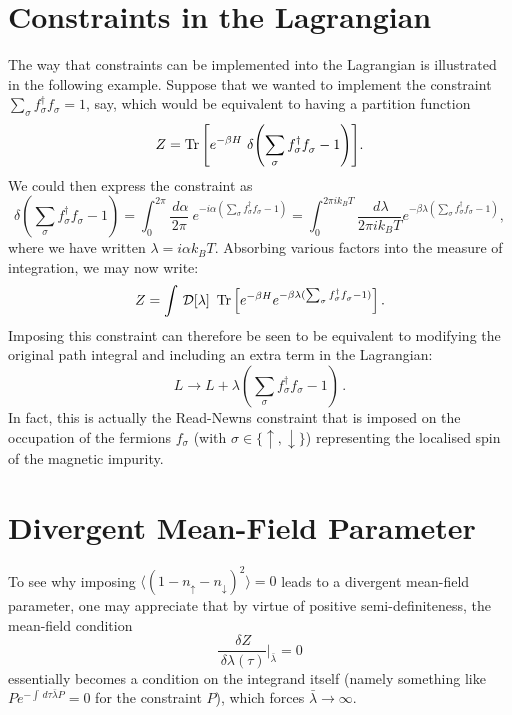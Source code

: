 
\appendix



\section{Constraints in the Lagrangian}
\label{sec:Constraints}

The way that constraints can be implemented into the Lagrangian is illustrated in the following example. Suppose that we wanted to implement the constraint $ \sum_{\sigma} f^{\dagger}_{\sigma} f^{}_{\sigma} = 1 $, say, which would be equivalent to having a partition function $$ Z = \operatorname{Tr}{\left[ e^{- \beta H}~\delta{\left( \sum_{\sigma} f^{\dagger}_{\sigma} f^{}_{\sigma} - 1 \right)} \right]} . $$ We could then express the constraint as $$ \delta{\left( \sum_{\sigma} f^{\dagger}_{\sigma} f^{}_{\sigma} - 1 \right)} = \int_{0}^{2 \pi} \frac{\,d\alpha}{2 \pi}~e^{- i \alpha (\sum_{\sigma} f^{\dagger}_{\sigma} f^{}_{\sigma} - 1)} = \int_{0}^{2 \pi i k_B T} \frac{\,d \lambda}{2 \pi i k_B T} e^{- \beta \lambda (\sum_{\sigma} f^{\dagger}_{\sigma} f^{}_{\sigma} - 1)}, $$ where we have written $ \lambda = i \alpha k_B T $. Absorbing various factors into the measure of integration, we may now write: $$ Z = \int \, \mathcal{D} [\lambda]~\operatorname{Tr}{\left[ e^{- \beta H} e^{- \beta \lambda (\sum_{\sigma} f^{\dagger}_{\sigma} f^{}_{\sigma} - 1)} \right]} \,. $$ Imposing this constraint can therefore be seen to be equivalent to modifying the original path integral and including an extra term in the Lagrangian: $$ L \rightarrow L + \lambda \left( \sum_{\sigma} f^{\dagger}_{\sigma} f^{}_{\sigma} - 1 \right) \,. $$ In fact, this is actually the Read-Newns constraint that is imposed on the occupation of the fermions $ f^{}_{\sigma} $ (with $ \sigma \in \{ \uparrow , \downarrow \}$) representing the localised spin of the magnetic impurity.

\section{Divergent Mean-Field Parameter}
\label{sec:Divergence}

To see why imposing $ \langle (1 - n_{\uparrow} - n_{\downarrow})^2 \rangle = 0 $ leads to a divergent mean-field parameter, one may appreciate that by virtue of positive semi-definiteness, the mean-field condition \[ \frac{\, \delta Z}{\, \delta \lambda(\tau)} \Bigr|_{\bar{\lambda}} = 0 \] essentially becomes a condition on the integrand itself (namely something like $ P e^{- \int \, d\tau \bar{\lambda} P} = 0 $ for the constraint $ P $), which forces $ \bar{\lambda} \rightarrow \infty $.

